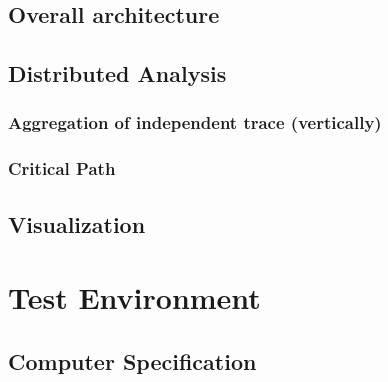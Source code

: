 \subsection{Overall architecture}
\subsection{}

\subsection{Distributed Analysis}

\subsubsection{Aggregation of independent trace (vertically)}

\subsubsection{Critical Path}

\subsection{Visualization}

\section{Test Environment}

\subsection{Computer Specification}

